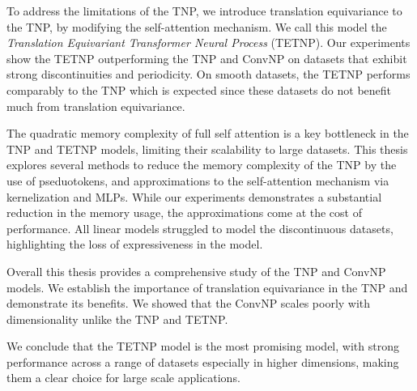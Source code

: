 \documentclass[../../main.tex]{subfiles}
\begin{document}
To address the limitations of the TNP, we introduce translation equivariance to the TNP, by modifying the self-attention mechanism. We call this model the \emph{Translation Equivariant Transformer Neural Process} (TETNP). Our experiments show the TETNP  outperforming the TNP and ConvNP on datasets that exhibit strong discontinuities and periodicity. On smooth datasets, the TETNP performs comparably to the TNP which is expected since these datasets do not benefit much from translation equivariance.

The quadratic memory complexity of full self attention is a key bottleneck in the TNP and TETNP models, limiting their scalability to large datasets. This thesis explores several methods to reduce the memory complexity of the TNP by the use of pseduotokens, and approximations to the self-attention mechanism via kernelization and MLPs. While our experiments demonstrates a substantial reduction in the memory usage, the approximations come at the cost of performance. All linear models struggled to model the discontinuous datasets, highlighting the loss of expressiveness in the model. 

Overall this thesis provides a comprehensive study of the TNP and ConvNP models. We establish the importance of translation equivariance in the TNP and demonstrate its benefits. We showed that the ConvNP scales poorly with dimensionality unlike the TNP and TETNP.

We conclude that the TETNP model is the most promising model, with strong performance across a range of datasets especially in higher dimensions, making them a clear choice for large scale applications. 
\end{document}
